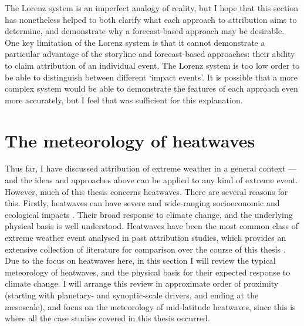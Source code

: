   The Lorenz system is an imperfect analogy of reality, but I hope that this section has nonetheless helped to both clarify what each approach to attribution aims to determine, and demonstrate why a forecast-based approach may be desirable. One key limitation of the Lorenz system is that it cannot demonstrate a particular advantage of the storyline and forecast-based approaches: their ability to claim attribution of an individual event. The Lorenz system is too low order to be able to distinguish between different `impact events'. It is possible that a more complex system \citep[yet still simpler than the weather on Earth, e.g.][]{hagedorn_predictability_2006} would be able to demonstrate the features of each approach even more accurately, but I feel that \citet{lorenz_deterministic_1963} was sufficient for this explanation.

\section{The meteorology of heatwaves}\label{intro:meteorology}

  Thus far, I have discussed attribution of extreme weather in a general context --- and the ideas and approaches above can be applied to any kind of extreme event. However, much of this thesis concerns heatwaves. There are several reasons for this. Firstly, heatwaves can have severe and wide-ranging socioeconomic and ecological impacts \citep{mitchell_attributing_2016,lo_estimating_2022,schauberger_consistent_2017,davis_arabica-like_2021}. Their broad response to climate change, and the underlying physical basis is well understood. Heatwaves have been the most common class of extreme weather event analysed in past attribution studies, which provides an extensive collection of literature for comparison over the course of this thesis \citep{noauthor_mapped_2021}. Due to the focus on heatwaves here, in this section I will review the typical meteorology of heatwaves, and the physical basis for their expected response to climate change. I will arrange this review in approximate order of proximity (starting with planetary- and synoptic-scale drivers, and ending at the mesoscale), and focus on the meteorology of mid-latitude heatwaves, since this is where all the case studies covered in this thesis occurred.

